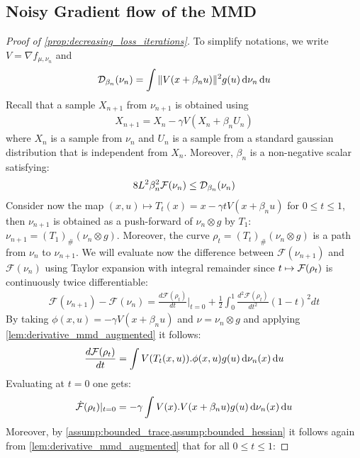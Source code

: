 \subsection{Noisy Gradient flow of the MMD}
\begin{proof}[Proof of \cref{prop:decreasing_loss_iterations}]\label{proof:prop:decreasing_loss_iterations}
To simplify notations, we write $V = \nabla f_{\mu,\nu_n}$ and 
	\[
	\mathcal{D}_{\beta_n}(\nu_n)  = \int \Vert V(x+\beta_n u) \Vert^2 g(u)\mathop{}\!\mathrm{d} \nu_n \mathop{}\!\mathrm{d} u  
	\]
	Recall that a sample $X_{n+1}$ from $\nu_{n+1}$ is obtained using 
	\begin{align}
		X_{n+1} = X_n - \gamma V(X_n+ \beta_n U_n)
	\end{align}
	where $X_n$ is a sample from $\nu_n$ and $U_n$ is a sample from a standard gaussian distribution that is independent from $X_n$. Moreover, $\beta_n$ is a non-negative scalar satisfying:
	\begin{align}\label{eq:control_noise_level_bis}
		8L^2\beta_n^2 {{\mathcal F}}(\nu_n) \leq \mathcal{D}_{\beta_n}(\nu_n)  
	\end{align}
	 Consider now the map $(x,u)\mapsto T_t(x)= x - \gamma tV(x+\beta_n u)$ for $0\leq t\leq 1$, then $\nu_{n+1}$ is obtained as a push-forward of $\nu_n\otimes g$ by $T_1$: $\nu_{n+1} = (T_1)_{\#}(\nu_n\otimes g)$. Moreover, the curve $\rho_t = (T_t)_{\#}(\nu_n\otimes g)$ is a path from $\nu_n$ to $\nu_{n+1}$. 
	 We will evaluate now the difference between $\mathcal{F}(\nu_{n+1})$ and $\mathcal{F}(\nu_{n})$ using  Taylor expansion with integral remainder since $t\mapsto {{\mathcal F}}(\rho_t)$ is continuously twice differentiable:
	\begin{align}\label{eq:taylor_expansion}
	\mathcal{F}(\nu_{n+1})-\mathcal{F}(\nu_{n})= \frac{d \mathcal{F}(\rho_t) }{dt}\vert_{t=0}+ \frac{1}{2} \int_0^1 \frac{d^2 \mathcal{F}(\rho_t)}{dt^2}(1-t)^2 dt 
	\end{align} 
	By taking $\phi(x,u) = - \gamma V(x+\beta_n u)$ and $ \nu = \nu_n\otimes g $  and applying \cref{lem:derivative_mmd_augmented} it follows:
	\begin{align*}
	\frac{d \mathcal{F}(\rho_t) }{dt} =\int V(T_t(x,u)).\phi(x,u) g(u)\mathop{}\!\mathrm{d}\nu_n(x)\mathop{}\!\mathrm{d} u
	\end{align*}
	Evaluating at $t=0$ one gets:
	\begin{align}
		\dot{{{\mathcal F}}}(\rho_t)\vert_{t=0} = -\gamma \int  V(x).V(x+\beta_n u) g(u)\mathop{}\!\mathrm{d}\nu_n(x)\mathop{}\!\mathrm{d} u
	\end{align}
	Moreover, by \cref{assump:bounded_trace,assump:bounded_hessian} it follows again from \cref{lem:derivative_mmd_augmented} that for all $0\leq t\leq 1$:

\end{proof}

